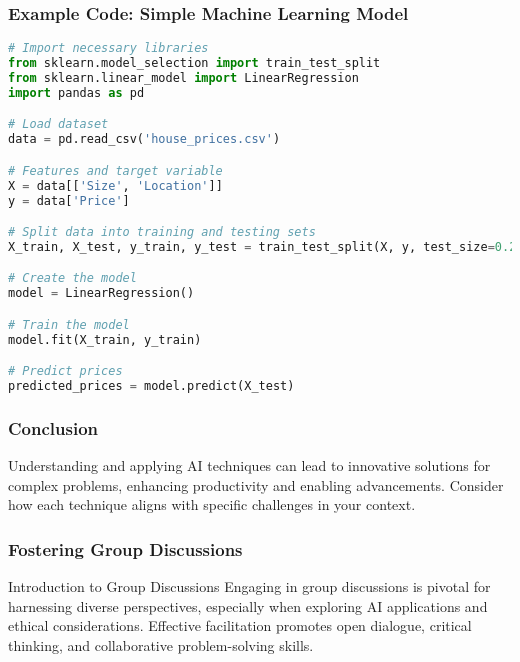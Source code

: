 \documentclass{beamer}
\begin{document}
\begin{frame}[fragile]
    \frametitle{Example Code: Simple Machine Learning Model}
    \begin{lstlisting}[language=Python]
# Import necessary libraries
from sklearn.model_selection import train_test_split
from sklearn.linear_model import LinearRegression
import pandas as pd

# Load dataset
data = pd.read_csv('house_prices.csv')

# Features and target variable
X = data[['Size', 'Location']]
y = data['Price']

# Split data into training and testing sets
X_train, X_test, y_train, y_test = train_test_split(X, y, test_size=0.2)

# Create the model
model = LinearRegression()

# Train the model
model.fit(X_train, y_train)

# Predict prices
predicted_prices = model.predict(X_test)
    \end{lstlisting}
\end{frame}

\begin{frame}
    \frametitle{Conclusion}
    Understanding and applying AI techniques can lead to innovative solutions for complex problems, enhancing productivity and enabling advancements. Consider how each technique aligns with specific challenges in your context.
\end{frame}

\begin{frame}[fragile]
    \frametitle{Fostering Group Discussions}
    \begin{block}{Introduction to Group Discussions}
        Engaging in group discussions is pivotal for harnessing diverse perspectives, especially when exploring AI applications and ethical considerations. Effective facilitation promotes open dialogue, critical thinking, and collaborative problem-solving skills.
    \end{block}
\end{frame}
\end{document}
